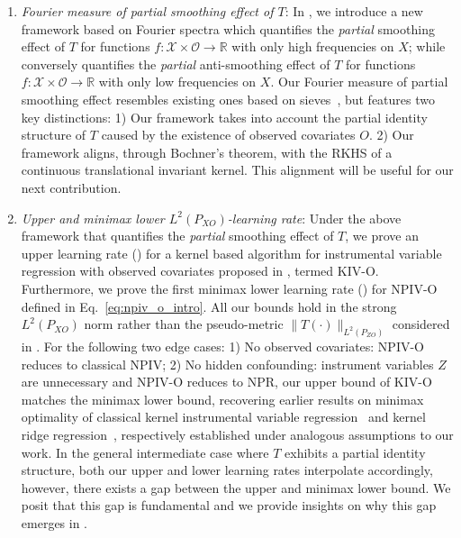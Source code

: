 \documentclass[11pt]{article}
\newcommand{\calO}{\mathcal{O}}
\newcommand{\calX}{\mathcal{X}}
\newcommand{\R}{\mathbb{R}}
\newcommand{\0}{\mathbf{0}}
\newcommand{\steve}[1]{#1}
\begin{document}
\begin{enumerate}[itemsep=5.0pt,topsep=0pt,leftmargin=*]
    \item \emph{Fourier measure of partial smoothing effect of $T$}:
    In , we introduce a new framework based on Fourier spectra which quantifies the \emph{partial} smoothing effect of $T$ for functions $f:\calX\times\calO\to\R$ with only high frequencies on $X$; while conversely quantifies the \emph{partial} anti-smoothing effect of $T$ for functions $f:\calX\times\calO\to\R$ with only low frequencies on $X$. 
    Our Fourier measure of partial smoothing effect resembles existing ones based on sieves~\citep{blundell2007semi,chen2024adaptiveestimationuniformconfidence,kim2025optimality}, but features two key distinctions:
    1) Our framework takes into account the partial identity structure of $T$ caused by the existence of observed covariates $O$.
    2) Our framework aligns, through Bochner's theorem, with the RKHS of a continuous translational invariant kernel. This alignment will be useful for our next contribution.
    \item \emph{Upper and minimax lower $L^2(P_{XO})$-learning rate}: 
    Under the above framework that quantifies the \emph{partial} smoothing effect of $T$, we prove an upper learning rate () for a kernel based algorithm for instrumental variable
    regression with observed covariates proposed in \citet{singh2024kernel}, termed KIV-O. Furthermore, we prove the first minimax lower learning rate () for NPIV-O defined in Eq.~\eqref{eq:npiv_o_intro}. All our bounds hold in the strong $L^2(P_{XO})$ norm rather than the pseudo-metric $\|T(\cdot)\|_{L^2(P_{ZO})}$ considered in \citet{singh2019kernel}. 
    For the following two edge cases: 1)
    No observed covariates: NPIV-O reduces to classical NPIV; 2) No hidden confounding: instrument variables $Z$ are unnecessary and NPIV-O reduces to NPR, our upper bound of KIV-O matches the minimax lower bound, recovering earlier results on minimax optimality of classical kernel instrumental variable regression~\citep{meunier2024nonparametricinstrumentalregressionkernel} and kernel ridge regression~\citep{hang2021optimal,fischer2020sobolev}, respectively established under analogous assumptions to our work. In the general intermediate case \steve{where $T$ exhibits a partial identity structure}, both our upper and lower learning rates interpolate accordingly, however, there exists a gap between the upper and minimax lower bound. \steve{We posit that this gap is fundamental and we provide insights on why this gap emerges in \Cref{sec:challenge_optimal}. 
}
\end{enumerate}
\end{document}
